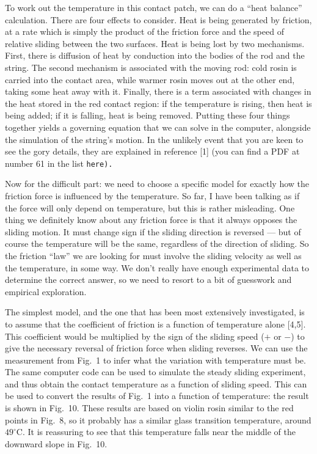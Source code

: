   To work out the temperature in this contact patch, we can do a “heat balance” 
  calculation. There are four effects to consider. Heat is being generated by 
  friction, at a rate which is simply the product of the friction force and the 
  speed of relative sliding between the two surfaces. Heat is being lost by two 
  mechanisms. First, there is diffusion of heat by conduction into the bodies 
  of the rod and the string. The second mechanism is associated with the moving 
  rod: cold rosin is carried into the contact area, while warmer rosin moves 
  out at the other end, taking some heat away with it. Finally, there is a term 
  associated with changes in the heat stored in the red contact region: if the 
  temperature is rising, then heat is being added; if it is falling, heat is 
  being removed. Putting these four things together yields a governing equation 
  that we can solve in the computer, alongside the simulation of the string's 
  motion. In the unlikely event that you are keen to see the gory details, they 
  are explained in reference [1] (you can find a PDF at number 61 in the list 
  \tt{}here\rm{}). 

  Now for the difficult part: we need to choose a specific model for exactly 
  how the friction force is influenced by the temperature. So far, I have been 
  talking as if the force will only depend on temperature, but this is rather 
  misleading. One thing we definitely know about any friction force is that it 
  always opposes the sliding motion. It must change sign if the sliding 
  direction is reversed — but of course the temperature will be the same, 
  regardless of the direction of sliding. So the friction “law” we are looking 
  for must involve the sliding velocity as well as the temperature, in some 
  way. We don’t really have enough experimental data to determine the correct 
  answer, so we need to resort to a bit of guesswork and empirical exploration. 

  The simplest model, and the one that has been most extensively investigated, 
  is to assume that the coefficient of friction is a function of temperature 
  alone [4,5]. This coefficient would be multiplied by the sign of the sliding 
  speed ($+$ or $-$) to give the necessary reversal of friction force when 
  sliding reverses. We can use the measurement from Fig.\ 1 to infer what the 
  variation with temperature must be. The same computer code can be used to 
  simulate the steady sliding experiment, and thus obtain the contact 
  temperature as a function of sliding speed. This can be used to convert the 
  results of Fig.\ 1 into a function of temperature: the result is shown in 
  Fig.\ 10. These results are based on violin rosin similar to the red points 
  in Fig.\ 8, so it probably has a similar glass transition temperature, around 
  $49^\circ$C. It is reassuring to see that this temperature falls near the 
  middle of the downward slope in Fig.\ 10. 

